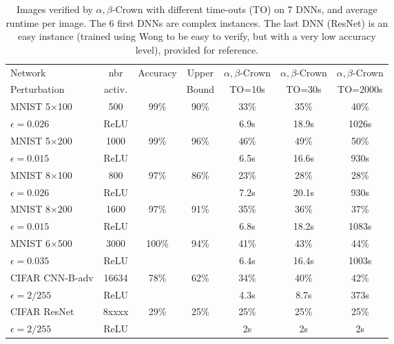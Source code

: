 \begin{table}[t!]
	\centering
	\begin{tabular}{||l|c|c|c||c|c|c||}
		\hline
		Network & nbr & Accuracy & Upper  & $\alpha,\beta$-Crown& $\alpha,\beta$-Crown & $\alpha,\beta$-Crown \\ 
		Perturbation & activ. &  & Bound & TO=10s & TO=30s & TO=2000s\\ \hline
		MNIST 5$\times$100 & 500 & 99\% & 90\% & 33\% & 35\% & 40\%   \\
		$\epsilon = 0.026$ & ReLU & &  & 6.9s &  18.9s &  1026s  \\  \hline
		MNIST 5$\times$200 & 1000 & 99\%  & 96\%  & 46\%  & 49\%  & 50\%   \\ 
		$\epsilon = 0.015$ & ReLU & &  & 6.5s &  16.6s &  930s  \\  \hline
		MNIST 8$\times$100 & 800 & 97\%  & 86\%  & 23\%  & 28\%  & 28\%   \\
		$\epsilon = 0.026$ & ReLU &  &  & 7.2s &  20.1s &  930s  \\  \hline
		MNIST 8$\times$200 & 1600 & 97\%  & 91\%  & 35\%  & 36\%  & 37\%   \\ 
		$\epsilon = 0.015$ & ReLU & &  & 6.8s &  18.2s &  1083s  \\  \hline
		MNIST 6$\times$500 & 3000 & 100\%  & 94\%  & 41\%  & 43\%  & 44\%   \\ 
		$\epsilon = 0.035$ & ReLU & &  & 6.4s &  16.4s &  1003s  \\  \hline
		CIFAR CNN-B-adv &  {\color{red} 16634}  &   78\%  & 62\%  &  34\% & 40\%  & 42\%   \\
		$\epsilon = 2/255$& ReLU &  &  & 4.3s & 8.7s & 373s  \\ \hline \hline
		CIFAR ResNet &   {\color{red} 8xxxx}             & 29\%  & 25\%  & 25\%  & 25\%  & 25\%   \\
		$\epsilon = 2/255$ & ReLU &  &  & 2s & 2s & 2s  \\ \hline
	\end{tabular}
	\caption{Images verified by $\alpha,\beta$-Crown with different time-outs (TO) on 7 DNNs, and average runtime per image. The 6 first DNNs are complex instances. The last DNN (ResNet) is an easy instance (trained using Wong to be easy to verify, but with a very low accuracy level), provided for reference.
	\vspace{-0.5cm}}
	\label{table_beta}
\end{table}


